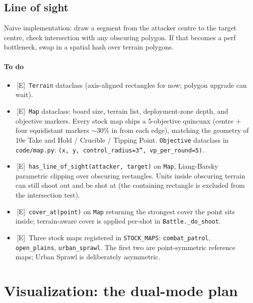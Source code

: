 \documentclass[11pt,a4paper]{article}
\newcommand{\eddie}{\textcolor{eddieblue}{\textsf{[E]}}}
\newcommand{\done}{\ding{51}\,}     %
\begin{document}
\subsection{Line of sight}
Naive implementation: draw a segment from the attacker centre to the
target centre, check intersection with any obscuring polygon. If that
becomes a perf bottleneck, swap in a spatial hash over terrain
polygons.

\paragraph{To do}
\begin{itemize}[label={},leftmargin=*,itemsep=2pt]
  \item \done \eddie\ \texttt{Terrain} dataclass (axis-aligned
    rectangles for now; polygon upgrade can wait).
  \item \done \eddie\ \texttt{Map} dataclass: board size, terrain list,
    deployment-zone depth, and objective markers. Every stock map
    ships a 5-objective quincunx (centre $+$ four equidistant markers
    $\sim$30\% in from each edge), matching the geometry of 10e Take
    and Hold / Crucible / Tipping Point. \texttt{Objective} dataclass
    in \texttt{code/map.py}: \texttt{(x, y, control\_radius=3'',
    vp\_per\_round=5)}.
  \item \done \eddie\ \texttt{has\_line\_of\_sight(attacker, target)}
    on \texttt{Map}, Liang-Barsky parametric clipping over obscuring
    rectangles. Units inside obscuring terrain can still shoot out and
    be shot at (the containing rectangle is excluded from the
    intersection test).
  \item \done \eddie\ \texttt{cover\_at(point)} on \texttt{Map}
    returning the strongest cover the point sits inside; terrain-aware
    cover is applied per-shot in \texttt{Battle.\_do\_shoot}.
  \item \done \eddie\ Three stock maps registered in
    \texttt{STOCK\_MAPS}: \texttt{combat\_patrol},
    \texttt{open\_plains}, \texttt{urban\_sprawl}. The first two are
    point-symmetric reference maps; Urban Sprawl is deliberately
    asymmetric.
\end{itemize}

\section{Visualization: the dual-mode plan}
\label{sec:viz}
\end{document}
